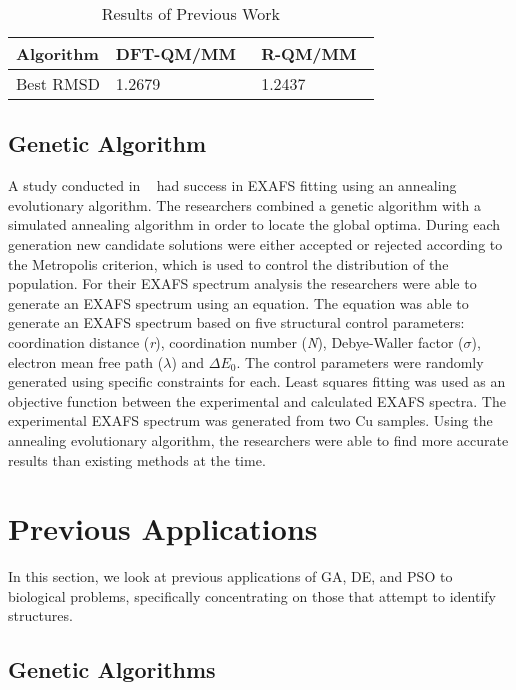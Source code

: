 \begin{table}
	\centering
	\begin{tabular}{ | l | l | l | }
		\hline
		Algorithm & DFT-QM/MM~\cite{luber2011s1} & R-QM/MM~\cite{luber2011s1} \\ \hline
		Best RMSD & 1.2679 & 1.2437 \\ \hline
	\end{tabular}
	\caption{Results of Previous Work}
	\label{fig:previous-work-rmsd}
\end{table}

\subsection{Genetic Algorithm}

A study conducted in ~\cite{cai1999analysis} had success in EXAFS fitting using an annealing evolutionary algorithm. The researchers combined a genetic algorithm with a simulated annealing algorithm in order to locate the global optima. During each generation new candidate solutions were either accepted or rejected according to the Metropolis criterion, which is used to control the distribution of the population. For their EXAFS spectrum analysis the researchers were able to generate an EXAFS spectrum using an equation. The equation was able to generate an EXAFS spectrum based on five structural control parameters: coordination distance (\textit{r}), coordination number (\textit{N}), Debye-Waller factor ($\sigma$), electron mean free path ($\lambda$) and $\Delta{E_{0}}$. The control parameters were randomly generated using specific constraints for each. Least squares fitting was used as an objective function between the experimental and calculated EXAFS spectra. The experimental EXAFS spectrum was generated from two Cu samples. Using the annealing evolutionary algorithm, the researchers were able to find more accurate results than existing methods at the time.

\section{Previous Applications}
\label{sec:prev-app}

In this section, we look at previous applications of GA, DE, and PSO to biological problems, specifically concentrating on those that attempt to identify structures.

\subsection{Genetic Algorithms}

